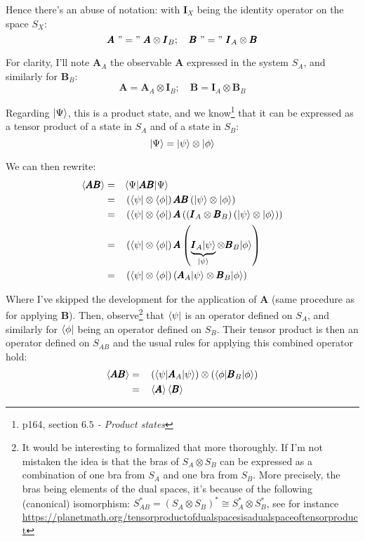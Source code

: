 \documentclass[solutions.tex]{subfiles}
\begin{document}
Hence there's an abuse of notation: with $\bm{I}_X$ being the
identity operator on the space $S_X$:
\[
	\pmb{A}\ "="\ \pmb{A}\otimes\pmb{I}_B;\quad
	\pmb{B}\ "="\ \pmb{I}_A\otimes\pmb{B}
\]

For clarity, I'll note $\bm{A}_A$ the observable $\bm{A}$
expressed in the system $S_A$, and similarly for $\bm{B}_B$:
\[
	\bm{A}=\bm{A}_A\otimes\bm{I}_B;\quad
	\bm{B}=\bm{I}_A\otimes\bm{B}_B
\]

Regarding $|\Psi\rangle$, this is a product state, and we know\footnote{%
p164, section \textit{$6.5$ - Product states}} that it can be expressed
as a tensor product of a state in $S_A$ and of a state in $S_B$:
\[
	|\Psi\rangle = |\psi\rangle\otimes|\phi\rangle
\]

We can then rewrite:
\begin{equation*}\begin{aligned}
	\left\langle \pmb{AB} \right\rangle &=&& \langle \Psi|\pmb{AB}|\Psi\rangle \\
	~ &=&& \left(\langle \psi|\otimes\langle \phi|\right)
		\pmb{AB}\left(|\psi\rangle\otimes|\phi\rangle\right) \\
	~ &=&& \left(\langle \psi|\otimes\langle \phi|\right)
		\pmb{A}\left(
			(\pmb{I}_A\otimes\pmb{B}_B)\left(|\psi\rangle\otimes|\phi\rangle\right)
		\right) \\
	~ &=&& \left(\langle \psi|\otimes\langle \phi|\right)
		\pmb{A}\left(\underbrace{\pmb{I}_A|\psi\rangle}_{|\psi\rangle}
			\otimes\pmb{B}_B|\phi\rangle\right) \\
	~ &=&& \left(\langle \psi|\otimes\langle \phi|\right)
		\left(\pmb{A}_A|\psi\rangle\otimes\pmb{B}_B|\phi\rangle\right) \\
\end{aligned}\end{equation*}

Where I've skipped the development for the application of
$\bm{A}$ (same procedure as for applying $\bm{B}$). Then,
observe\footnote{It would be interesting to formalized that more thoroughly.
If I'm not mistaken the idea is that the bras of $S_A\otimes S_B$ can be
expressed as a combination of one bra from $S_A$ and one bra from $S_B$.
More precisely, the bras being elements of the dual spaces, it's because
of the following (canonical) isomorphism:
$S_{AB}^* = (S_A\otimes S_B)^* \cong S_A^*\otimes S_B^*$, see for instance
\url{https://planetmath.org/tensorproductofdualspacesisadualspaceoftensorproduct}}
that $\langle \psi|$ is an operator defined on $S_A$, and similarly for
$\langle \phi|$ being an operator defined on $S_B$. Their tensor product is
then an operator defined on $S_{AB}$ and the usual rules for applying this
combined operator hold:
\begin{equation*}\begin{aligned}
	\left\langle \pmb{AB} \right\rangle &=&&
		\left(\langle \psi|\pmb{A}_A|\psi\rangle\right)
		\otimes
		\left(\langle \phi|\pmb{B}_B|\phi\rangle\right) \\
	~ &=&& \left\langle \pmb{A} \right\rangle\left\langle \pmb{B} \right\rangle \\
\end{aligned}\end{equation*}
\end{document}
